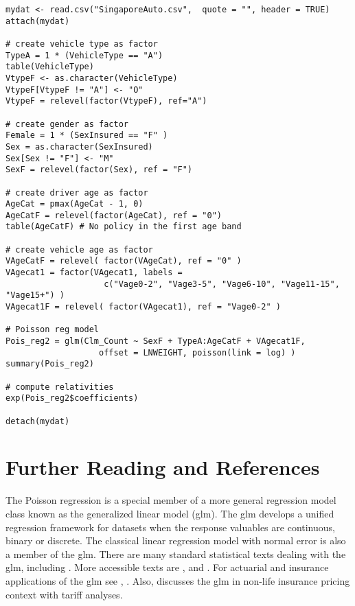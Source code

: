\documentclass[12pt]{article}
\begin{document}
%
%
%
\begin{verbatim}
mydat <- read.csv("SingaporeAuto.csv",  quote = "", header = TRUE)
attach(mydat)

# create vehicle type as factor
TypeA = 1 * (VehicleType == "A")
table(VehicleType)
VtypeF <- as.character(VehicleType)
VtypeF[VtypeF != "A"] <- "O"
VtypeF = relevel(factor(VtypeF), ref="A")

# create gender as factor
Female = 1 * (SexInsured == "F" )
Sex = as.character(SexInsured)
Sex[Sex != "F"] <- "M"
SexF = relevel(factor(Sex), ref = "F")

# create driver age as factor
AgeCat = pmax(AgeCat - 1, 0)
AgeCatF = relevel(factor(AgeCat), ref = "0")
table(AgeCatF) # No policy in the first age band

# create vehicle age as factor
VAgeCatF = relevel( factor(VAgeCat), ref = "0" )
VAgecat1 = factor(VAgecat1, labels = 
             		c("Vage0-2", "Vage3-5", "Vage6-10", "Vage11-15", "Vage15+") )
VAgecat1F = relevel( factor(VAgecat1), ref = "Vage0-2" )

# Poisson reg model
Pois_reg2 = glm(Clm_Count ~ SexF + TypeA:AgeCatF + VAgecat1F, 
                   offset = LNWEIGHT, poisson(link = log) )
summary(Pois_reg2) 

# compute relativities
exp(Pois_reg2$coefficients)

detach(mydat)
\end{verbatim}
%
%
%
\section{Further Reading and References}
The Poisson regression is a special member of a more general regression model class known as the generalized linear model (glm). The glm develops a unified regression framework for datasets when the response valuables are continuous, binary or discrete.  The classical linear regression model with normal error is also a member of the glm. There are many standard statistical texts dealing with the glm, including \cite{mccullagh1973nelder}. More accessible texts are \cite{Dobso+Barne:08a}, \cite{Agres:96a} and \cite{Faraw:16a}.  For actuarial and insurance applications of the glm see \cite{Frees:10a}, \cite{De-Jo+Helle+etal:08a}. Also, \cite{Ohlss+Johan:10a} discusses the glm in non-life insurance pricing context with tariff analyses.
\end{document}
